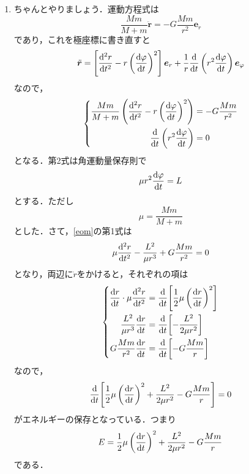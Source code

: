 \documentclass[a4paper,pdflatex,ja=standard]{bxjsarticle}
\begin{document}
\begin{enumerate}
  \item 
  ちゃんとやりましょう．運動方程式は
  \begin{equation}
    \frac{Mm}{M+m}\ddot{\bm{r}}
    =
    -G\frac{Mm}{r^2}\bm{e}_{r}
  \end{equation}
  であり，これを極座標に書き直すと
  \begin{equation}
    \ddot{\bm{r}}
    =
    \left[ 
      \dv[2]{r}{t}
      -
      r\left( \dv{\varphi}{t} \right)^2
    \right]
    \bm{e}_{r}
    +
    \frac{1}{r}\dv{}{t}\left( r^2\dv{\varphi}{t} \right)
    \bm{e}_{\varphi}
  \end{equation}
  なので，
  \begin{equation}
    \left\{
      \begin{alignedat}{1}
        \frac{Mm}{M+m}\left(  
          \dv[2]{r}{t}
          -
          r\left( \dv{\varphi}{t} \right)^2
        \right)
        &=
        -G\frac{Mm}{r^2}
        \\
        \dv{}{t}\left( r^2\dv{\varphi}{t} \right)
        &=
        0
      \end{alignedat}
    \right.
    \label{eom}
  \end{equation}
  となる．第2式は角運動量保存則で
  \begin{equation}
    \mu r^2\dv{\varphi}{t}
    =
    L
  \end{equation}
  とする．ただし
  \begin{equation}
    \mu
    =
    \frac{Mm}{M+m}
  \end{equation}
  とした．さて，\eqref{eom}の第1式は
  \begin{equation}
    \mu\dv[2]{r}{t}
    -
    \frac{L^2}{\mu r^3}
    +
    G\frac{Mm}{r^2}
    =
    0
  \end{equation}
  となり，両辺に$\dot{r}$をかけると，それぞれの項は
  \begin{equation}
    \left\{
      \begin{alignedat}{1}
        \dv{r}{t}\cdot\mu\dv[2]{r}{t}
        &=
        \dv{}{t}{\left[  
          \frac{1}{2}\mu\left( \dv{r}{t} \right)^2
        \right]}
        \\
        \frac{L^2}{\mu r^3}\dv{r}{t}
        &=
        \dv{}{t}{\left[  
          -\frac{L^2}{2\mu r^2}  
        \right]}
        \\
        G\frac{Mm}{r^2}\dv{r}{t}
        &=
        \dv{}{t}{\left[  
          -G\frac{Mm}{r}
        \right]}
      \end{alignedat}
    \right.
  \end{equation}
  なので，
  \begin{equation}
    \dv{}{t}{\left[  
      \frac{1}{2}\mu\left( \dv{r}{t} \right)^2
      +
      \frac{L^2}{2\mu r^2}  
      -
      G\frac{Mm}{r}
    \right]}
    =
    0
  \end{equation}
  がエネルギーの保存となっている．つまり
  \begin{equation}
    E
    =
    \frac{1}{2}\mu\left( \dv{r}{t} \right)^2
    +
    \frac{L^2}{2\mu r^2}  
    -
    G\frac{Mm}{r}
  \end{equation}
  である．


\end{enumerate}
\end{document}

